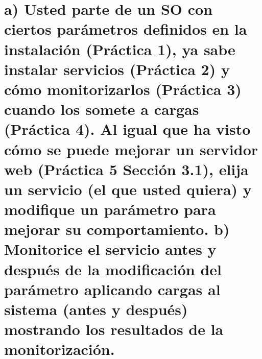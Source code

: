 \section{a) Usted parte de un SO con ciertos parámetros definidos en la instalación (Práctica 1), ya sabe instalar servicios (Práctica 2) y cómo monitorizarlos (Práctica 3) cuando los somete a cargas (Práctica 4). Al igual que ha visto cómo se puede mejorar un servidor web (Práctica 5 Sección 3.1), elija un servicio (el que usted quiera) y modifique un parámetro para mejorar su comportamiento. b) Monitorice el servicio antes y después de la modificación del parámetro aplicando cargas al sistema (antes y después) mostrando los resultados de la monitorización.}







